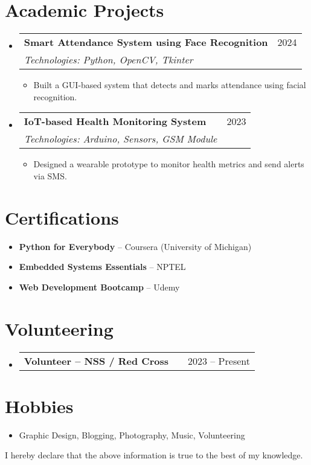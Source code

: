 \documentclass[a4paper,11pt]{article}
\makeatletter
\newcommand{\resumeItem}[1]{\item\small{#1}}
\newcommand{\resumeItemListStart}{\begin{itemize}[rightmargin=0.11in]}
\newcommand{\resumeItemListEnd}{\end{itemize}}
\newcommand{\resumeTrioHeading}[3]{
  \item\small{
    \begin{tabular*}{0.96\textwidth}[t]{l@{\extracolsep{\fill}}c@{\extracolsep{\fill}}r}
      \textbf{#1} & \textit{#2} & #3
    \end{tabular*}
  }
}
\newcommand{\resumeQuadHeading}[4]{
  \item
  \begin{tabular*}{0.96\textwidth}[t]{l@{\extracolsep{\fill}}r}
    \textbf{#1} & #2 \\
    \textit{\small#3} & \textit{\small #4} \\
  \end{tabular*}
}
\newcommand{\resumeHeadingListStart}{\begin{itemize}[leftmargin=0.15in, label={}]}
\newcommand{\resumeHeadingListEnd}{\end{itemize}}
\makeatother
\begin{document}
\section{Academic Projects}
\resumeHeadingListStart{}
  \resumeQuadHeading{Smart Attendance System using Face Recognition}{2024}
  {Technologies: Python, OpenCV, Tkinter}{}
  \resumeItemListStart{}
    \resumeItem{Built a GUI-based system that detects and marks attendance using facial recognition.}
  \resumeItemListEnd{}

  \resumeQuadHeading{IoT-based Health Monitoring System}{2023}
  {Technologies: Arduino, Sensors, GSM Module}{}
  \resumeItemListStart{}
    \resumeItem{Designed a wearable prototype to monitor health metrics and send alerts via SMS.}
  \resumeItemListEnd{}
\resumeHeadingListEnd{}

\section{Certifications}
\begin{itemize}
  \item \textbf{Python for Everybody} – Coursera (University of Michigan)
  \item \textbf{Embedded Systems Essentials} – NPTEL
  \item \textbf{Web Development Bootcamp} – Udemy
\end{itemize}

\section{Volunteering}
\resumeHeadingListStart{}
  \resumeTrioHeading{Volunteer – NSS / Red Cross}{}{2023 – Present}
\resumeHeadingListEnd{}

\section{Hobbies}
\begin{itemize}
  \item Graphic Design, Blogging, Photography, Music, Volunteering
\end{itemize}

\vspace{0.5cm}
\begin{center}
  I hereby declare that the above information is true to the best of my knowledge.
\end{center}
\end{document}

